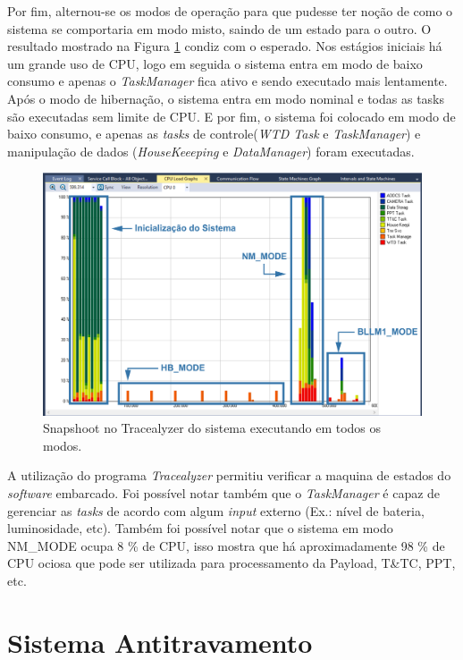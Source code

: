 \newpage
Por fim, alternou-se os modos de operação para que pudesse ter noção de como o sistema se comportaria em modo misto, saindo de um estado para o outro. O resultado mostrado na Figura \ref{trace_snapshoot_8} condiz com o esperado. Nos estágios iniciais há um grande uso de CPU, logo em seguida o sistema entra em modo de baixo consumo e apenas o \textit{TaskManager} fica ativo e sendo executado mais lentamente. Após o modo de hibernação, o sistema entra em modo nominal e todas as tasks são executadas sem limite de CPU. E por fim, o sistema foi colocado em modo de baixo consumo, e apenas as \textit{tasks} de controle(\textit{WTD Task} e \textit{TaskManager}) e manipulação de dados (\textit{HouseKeeeping} e \textit{DataManager}) foram executadas.

\begin{figure}[h]
	\centering
	
	\includegraphics[keepaspectratio=true,scale=0.51]{figuras/trace_snapshoot_8.PNG}
	\caption{Snapshoot no Tracealyzer do sistema executando em todos os modos.}
	\label{trace_snapshoot_8}
\end{figure}
\FloatBarrier

A utilização do programa \textit{Tracealyzer} permitiu verificar a maquina de estados do \textit{software} embarcado. Foi possível notar também que o \textit{TaskManager} é capaz de gerenciar as \textit{tasks} de acordo com algum \textit{input} externo (Ex.: nível de bateria, luminosidade, etc). Também foi possível notar que o sistema em modo NM\_MODE ocupa 8 \%  de CPU, isso mostra que há aproximadamente 98 \% de CPU ociosa que pode ser utilizada para processamento da Payload, T\&TC, PPT, etc.

\section{Sistema Antitravamento}

